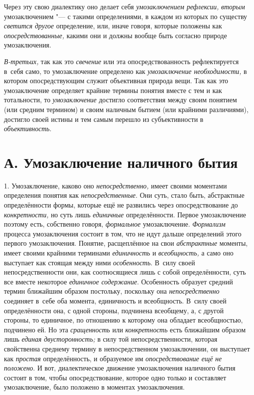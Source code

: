 Через эту свою диалектику оно делает себя
{\em умозаключением рефлексии,}
{\em вторым}
умозаключением "--- с такими определениями, в
каждом из которых по существу
{\em светится другое}
определение, или, иначе говоря, которые положены как
{\em опосредствованные,}
какими они и должны вообще быть согласно природе
умозаключения.

{\em В-третьих,} так как
это {\em свечение} или
эта опосредствованность рефлектируется в~себя само, то умозаключение
определено как {\em умозаключение
необходимости,} в котором опосредствующим служит объективная
природа вещи. Так как это умозаключение определяет крайние термины понятия
вместе с тем и как тотальности, то
{\em умозаключение}
достигло соответствия между своим понятием (или средним
термином) и своим наличным бытием (или крайними различиями), достигло своей
истины и тем самым перешло из субъективности в
{\em объективность}.

\section[А. Умозаключение наличного бытия]{А. Умозаключение наличного бытия}

1. Умозаключение, каково оно
{\em непосредственно,}
имеет своими моментами определения понятия как
{\em непосредственные}.
Они суть, стало быть, абстрактные определённости формы,
которые ещё не развились через опосредствование до
{\em конкретности,} но
суть лишь {\em единичные}
определённости. Первое умозаключение поэтому есть,
собственно говоря,
{\em формальное}
умозаключение.
{\em Формализм} процесса
умозаключения состоит в том, что не идут дальше определений этого первого
умозаключения. Понятие, расщеплённое на свои
{\em абстрактные}
моменты, имеет своими крайними терминами
{\em единичность} и
{\em всеобщность,} а само
оно выступает как стоящая между ними
{\em особенность}. В~силу
своей непосредственности они, как соотносящиеся лишь с собой
определённости, суть все вместе некоторое
{\em единичное содержание}.
Особенность образует средний термин ближайшим образом
постольку, поскольку она
{\em непосредственно}
соединяет в~себе оба момента, единичность и всеобщность. В~силу своей
определённости она, с одной стороны, подчинена всеобщему, а, с
другой стороны, то единичное, по отношению к которому она обладает
всеобщностью, подчинено ей. Но эта {\em сращенность} или
{\em конкретность}
есть ближайшим образом лишь
{\em единая двусторонность;}
в силу той непосредственности, которая свойственна среднему
термину в непосредственном умозаключении, он выступает как
{\em простая}
определённость, и образуемое им
{\em опосредствование ещё не положено}.
И вот, диалектическое движение умозаключения наличного бытия
состоит в том, чтобы опосредствование, которое одно только и составляет
умозаключение, было положено в моментах умозаключения.

